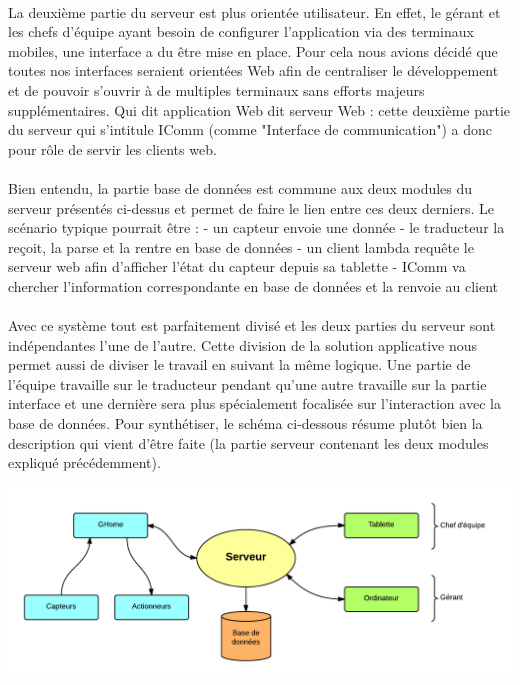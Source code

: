 \paragraph{}
La deuxième partie du serveur est plus orientée utilisateur. En effet, le gérant et les chefs d'équipe ayant besoin de configurer l'application via des terminaux mobiles, une interface a du être mise en place. Pour cela nous avions décidé que toutes nos interfaces seraient orientées Web afin de centraliser le développement et de pouvoir s'ouvrir à de multiples terminaux sans efforts majeurs supplémentaires. Qui dit application Web dit serveur Web : cette deuxième partie du serveur qui s'intitule IComm (comme "Interface de communication") a donc pour rôle de servir les clients web.

\paragraph{}
Bien entendu, la partie base de données est commune aux deux modules du serveur présentés ci-dessus et permet de faire le lien entre ces deux derniers. Le scénario typique pourrait être :
- un capteur envoie une donnée
- le traducteur la reçoit, la parse et la rentre en base de données
- un client lambda requête le serveur web afin d'afficher l'état du capteur depuis sa tablette
- IComm va chercher l'information correspondante en base de données et la renvoie au client

\paragraph{}
Avec ce système tout est parfaitement divisé et les deux parties du serveur sont indépendantes l'une de l'autre. Cette division de la solution applicative nous permet aussi de diviser le travail en suivant la même logique. Une partie de l'équipe travaille sur le traducteur pendant qu'une autre travaille sur la partie interface et une dernière sera plus spécialement focalisée sur l'interaction avec la base de données. Pour synthétiser, le schéma ci-dessous résume plutôt bien la description qui vient d'être faite (la partie serveur contenant les deux modules expliqué précédemment).

\includegraphics[scale=0.3]{image/architecture_materielle}

